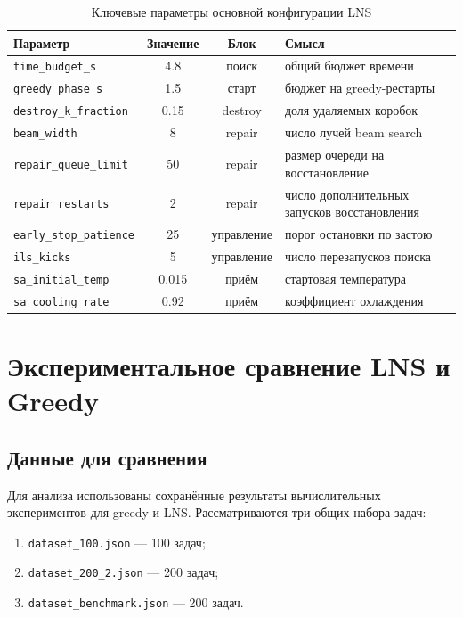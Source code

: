 \documentclass[12pt,a4paper]{article}
\begin{document}
\begin{table}[H]
\small
\centering
\caption{Ключевые параметры основной конфигурации LNS}
\label{tab:cfg}
\begin{tabular}{>{\raggedright\arraybackslash}p{}cc>{\raggedright\arraybackslash}p{}}
\toprule
\textbf{Параметр} & \textbf{Значение} & \textbf{Блок} & \textbf{Смысл} \\
\midrule
\texttt{time\_budget\_s} & 4.8 & поиск & общий бюджет времени \\
\texttt{greedy\_phase\_s} & 1.5 & старт & бюджет на greedy-рестарты \\
\texttt{destroy\_k\_fraction} & 0.15 & destroy & доля удаляемых коробок \\
\texttt{beam\_width} & 8 & repair & число лучей beam search \\
\texttt{repair\_queue\_limit} & 50 & repair & размер очереди на восстановление \\
\texttt{repair\_restarts} & 2 & repair & число дополнительных запусков восстановления \\
\texttt{early\_stop\_patience} & 25 & управление & порог остановки по застою \\
\texttt{ils\_kicks} & 5 & управление & число перезапусков поиска \\
\texttt{sa\_initial\_temp} & 0.015 & приём & стартовая температура \\
\texttt{sa\_cooling\_rate} & 0.92 & приём & коэффициент охлаждения \\
\bottomrule
\end{tabular}
\end{table}

\section{Экспериментальное сравнение LNS и Greedy}

\subsection{Данные для сравнения}

Для анализа использованы сохранённые результаты вычислительных экспериментов для greedy и LNS. Рассматриваются три общих набора задач:
\begin{enumerate}
  \item \texttt{dataset\_100.json} --- 100 задач;
  \item \texttt{dataset\_200\_2.json} --- 200 задач;
  \item \texttt{dataset\_benchmark.json} --- 200 задач.
\end{enumerate}
\end{document}
